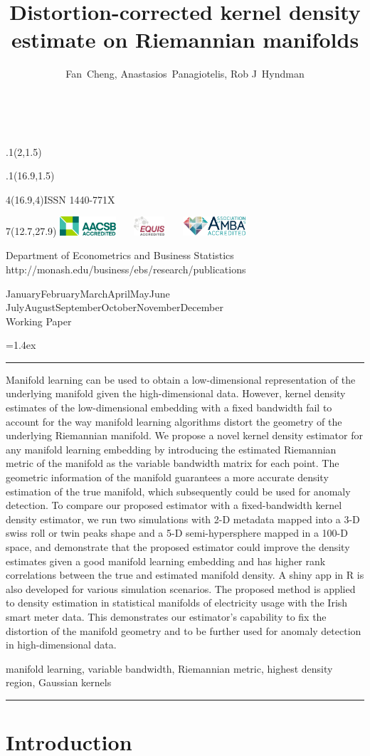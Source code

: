 \documentclass[11pt,a4paper,]{article}
\title{Distortion-corrected kernel density estimate on Riemannian manifolds}
\author{Fan~Cheng, Anastasios~Panagiotelis, Rob J~Hyndman}
\date{\sf\Date~\Month~\Year}
\makeatletter
\def\Date{\number\day}
\def\Month{\ifcase\month\or
 January\or February\or March\or April\or May\or June\or
 July\or August\or September\or October\or November\or December\fi}
\def\Year{\number\year}
\def\showjel{{\large\textsf{\textbf{JEL classification:}}~\@jel}}
\def\cover{{\sffamily\setcounter{page}{0}
        \thispagestyle{empty}
        \placefig{2}{1.5}{width=5cm}{monash2}
        \placefig{16.9}{1.5}{width=2.1cm}{MBusSchool}
        \begin{textblock}{4}(16.9,4)ISSN 1440-771X\end{textblock}
        \begin{textblock}{7}(12.7,27.9)\hfill
        \includegraphics[height=0.7cm]{AACSB}~~~
        \includegraphics[height=0.7cm]{EQUIS}~~~
        \includegraphics[height=0.7cm]{AMBA}
        \end{textblock}
        \vspace*{2cm}
        \begin{center}\Large
        Department of Econometrics and Business Statistics\\[.5cm]
        \footnotesize http://monash.edu/business/ebs/research/publications
        \end{center}\vspace{2cm}
        \begin{center}
        \fbox{\parbox{14cm}{\begin{onehalfspace}\centering\Huge\vspace*{0.3cm}
                \textsf{\textbf{\expandafter{\@title}}}\vspace{1cm}\par
                \LARGE\@author\end{onehalfspace}
        }}
        \end{center}
        \vfill
                \begin{center}\Large
                \Month~\Year\\[1cm]
                Working Paper \@wp
        \end{center}\vspace*{2cm}}}
\def\pageone{{\sffamily\setstretch{1}%
        \thispagestyle{empty}%
        \vbox to \textheight{%
        \raggedright\baselineskip=1.2cm
     {\fontsize{24.88}{30}\sffamily\textbf{\expandafter{\@title}}}
        \vspace{2cm}\par
        \hspace{1cm}\parbox{14cm}{\sffamily\large\@addresses}\vspace{1cm}\vfill
        \hspace{1cm}{\large\Date~\Month~\Year}\\[1cm]
        \hspace{1cm}\showjel\vss}}}
\def\blindtitle{{\sffamily
     \thispagestyle{plain}\raggedright\baselineskip=1.2cm
     {\fontsize{24.88}{30}\sffamily\textbf{\expandafter{\@title}}}\vspace{1cm}\par
        }}
\def\titlepage{{\cover\newpage\pageone\newpage\blindtitle}}
\let\maketitle\titlepage
\newenvironment{keywords}{\par\vspace{0.5cm}\noindent{\sffamily\textbf{Keywords:}}}{\vspace{0.25cm}\par\hrule\vspace{0.5cm}\par}
\renewenvironment{abstract}{\begin{minipage}{\textwidth}\parskip=1.4ex\noindent
\hrule\vspace{0.1cm}\par{\sffamily\textbf{\abstractname}}\newline}
  {\end{minipage}}
\def\placefig#1#2#3#4{\begin{textblock}{.1}(#1,#2)\rlap{\texttt{[image: \#4]}}\end{textblock}}
\makeatother
\begin{document}
\maketitle
\begin{abstract}
Manifold learning can be used to obtain a low-dimensional representation of the underlying manifold given the high-dimensional data. However, kernel density estimates of the low-dimensional embedding with a fixed bandwidth fail to account for the way manifold learning algorithms distort the geometry of the underlying Riemannian manifold. We propose a novel kernel density estimator for any manifold learning embedding by introducing the estimated Riemannian metric of the manifold as the variable bandwidth matrix for each point. The geometric information of the manifold guarantees a more accurate density estimation of the true manifold, which subsequently could be used for anomaly detection. To compare our proposed estimator with a fixed-bandwidth kernel density estimator, we run two simulations with 2-D metadata mapped into a 3-D swiss roll or twin peaks shape and a 5-D semi-hypersphere mapped in a 100-D space, and demonstrate that the proposed estimator could improve the density estimates given a good manifold learning embedding and has higher rank correlations between the true and estimated manifold density. A shiny app in R is also developed for various simulation scenarios. The proposed method is applied to density estimation in statistical manifolds of electricity usage with the Irish smart meter data. This demonstrates our estimator's capability to fix the distortion of the manifold geometry and to be further used for anomaly detection in high-dimensional data.
\end{abstract}
\begin{keywords}
manifold learning, variable bandwidth, Riemannian metric, highest density region, Gaussian kernels
\end{keywords}

\newpage

\hypertarget{introduction}{%
\section{Introduction}\label{introduction}}
\end{document}
